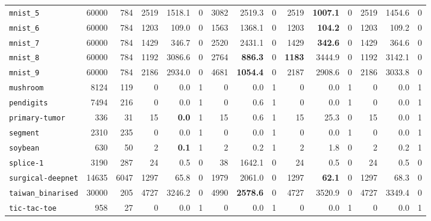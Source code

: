 \begin{tabular}{lccrrrrrrrrrrrr}
\texttt{mnist\_5} & \multicolumn{1}{r}{60000} & \multicolumn{1}{r}{784}  & 2519 & 1518.1 & 0 & 3082 & 2519.3 & 0 & 2519 & \textbf{1007.1} & 0 & 2519 & 1454.6 & 0\\
\texttt{mnist\_6} & \multicolumn{1}{r}{60000} & \multicolumn{1}{r}{784}  & 1203 & 109.0 & 0 & 1563 & 1368.1 & 0 & 1203 & \textbf{104.2} & 0 & 1203 & 109.2 & 0\\
\texttt{mnist\_7} & \multicolumn{1}{r}{60000} & \multicolumn{1}{r}{784}  & 1429 & 346.7 & 0 & 2520 & 2431.1 & 0 & 1429 & \textbf{342.6} & 0 & 1429 & 364.6 & 0\\
\texttt{mnist\_8} & \multicolumn{1}{r}{60000} & \multicolumn{1}{r}{784}  & 1192 & 3086.6 & 0 & 2764 & \textbf{886.3} & 0 & \textbf{1183} & 3444.9 & 0 & 1192 & 3142.1 & 0\\
\texttt{mnist\_9} & \multicolumn{1}{r}{60000} & \multicolumn{1}{r}{784}  & 2186 & 2934.0 & 0 & 4681 & \textbf{1054.4} & 0 & 2187 & 2908.6 & 0 & 2186 & 3033.8 & 0\\
\texttt{mushroom} & \multicolumn{1}{r}{8124} & \multicolumn{1}{r}{119}  & 0 & 0.0 & 1 & 0 & 0.0 & 1 & 0 & 0.0 & 1 & 0 & 0.0 & 1\\
\texttt{pendigits} & \multicolumn{1}{r}{7494} & \multicolumn{1}{r}{216}  & 0 & 0.0 & 1 & 0 & 0.6 & 1 & 0 & 0.0 & 1 & 0 & 0.0 & 1\\
\texttt{primary-tumor} & \multicolumn{1}{r}{336} & \multicolumn{1}{r}{31}  & 15 & \textbf{0.0} & 1 & 15 & 0.6 & 1 & 15 & 25.3 & 0 & 15 & 0.0 & 1\\
\texttt{segment} & \multicolumn{1}{r}{2310} & \multicolumn{1}{r}{235}  & 0 & 0.0 & 1 & 0 & 0.0 & 1 & 0 & 0.0 & 1 & 0 & 0.0 & 1\\
\texttt{soybean} & \multicolumn{1}{r}{630} & \multicolumn{1}{r}{50}  & 2 & \textbf{0.1} & 1 & 2 & 0.2 & 1 & 2 & 1.8 & 0 & 2 & 0.2 & 1\\
\texttt{splice-1} & \multicolumn{1}{r}{3190} & \multicolumn{1}{r}{287}  & 24 & 0.5 & 0 & 38 & 1642.1 & 0 & 24 & 0.5 & 0 & 24 & 0.5 & 0\\
\texttt{surgical-deepnet} & \multicolumn{1}{r}{14635} & \multicolumn{1}{r}{6047}  & 1297 & 65.8 & 0 & 1979 & 2061.0 & 0 & 1297 & \textbf{62.1} & 0 & 1297 & 68.3 & 0\\
\texttt{taiwan\_binarised} & \multicolumn{1}{r}{30000} & \multicolumn{1}{r}{205}  & 4727 & 3246.2 & 0 & 4990 & \textbf{2578.6} & 0 & 4727 & 3520.9 & 0 & 4727 & 3349.4 & 0\\
\texttt{tic-tac-toe} & \multicolumn{1}{r}{958} & \multicolumn{1}{r}{27}  & 0 & 0.0 & 1 & 0 & 0.0 & 1 & 0 & 0.0 & 1 & 0 & 0.0 & 1\\

\end{tabular}
